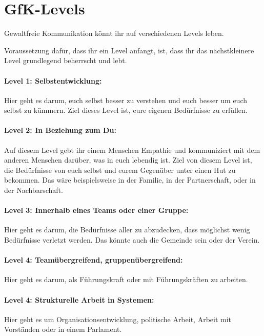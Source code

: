 \section{GfK-Levels}
\label{gfk-levels}

Gewaltfreie Kommunikation könnt ihr auf verschiedenen Levels leben.

Voraussetzung dafür, dass ihr ein Level anfangt, ist, dass ihr das nächstkleinere Level grundlegend beherrscht und lebt.

\paragraph{Level 1: Selbstentwicklung:} Hier geht es darum, euch selbst besser zu verstehen und euch besser um euch selbst zu kümmern. Ziel dieses Level ist, eure eigenen Bedürfnisse zu erfüllen.

\paragraph{Level 2: In Beziehung zum Du:} Auf diesem Level gebt ihr einem Menschen Empathie und kommuniziert mit dem anderen Menschen darüber, was in euch lebendig ist. Ziel von diesem Level ist, die Bedürfnisse von euch selbst und eurem Gegenüber unter einen Hut zu bekommen. Das wäre beispielsweise in der Familie, in der Partnerschaft, oder in der Nachbarschaft.

\paragraph{Level 3: Innerhalb eines Teams oder einer Gruppe:} Hier geht es darum, die Bedürfnisse aller zu abzudecken, dass möglichst wenig Bedürfnisse verletzt werden. Das könnte auch die Gemeinde sein oder der Verein.

\paragraph{Level 4: Teamübergreifend, gruppenübergreifend:} Hier geht es darum, als Führungskraft oder mit Führungskräften zu arbeiten.

\paragraph{Level 4: Strukturelle Arbeit in Systemen:} Hier geht es um Organisationsentwicklung, politische Arbeit, Arbeit mit Vorständen oder in einem Parlament.
